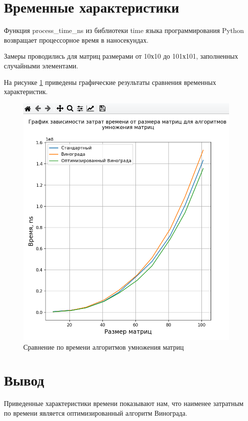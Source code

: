 \section{Временные характеристики}

Функция process\_time\_ns из библиотеки time языка программирования Python возвращает  процессорное время в наносекундах.

Замеры проводились для матриц размерами от 10х10 до 101х101, заполненных случайными элементами.

На рисунке \ref{img:time} приведены графические результаты сравнения временных характеристик.

\begin{figure}[H]
	\begin{center}
		\includegraphics[scale=0.7]{img/time.png}
	\end{center}
	\captionsetup{justification=centering}
	\caption{Сравнение по времени алгоритмов умножения матриц}
	\label{img:time}
\end{figure}

\section{Вывод}
Приведенные характеристики времени показывают нам, что наименее затратным по времени является оптимизированный алгоритм Винограда.